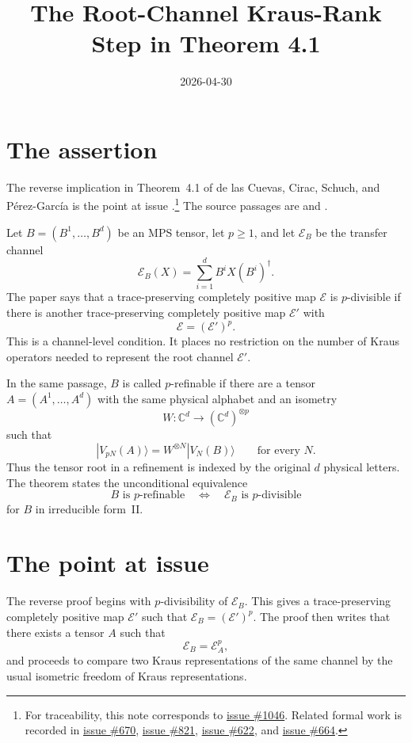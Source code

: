\documentclass{article}
\title{The Root-Channel Kraus-Rank Step in Theorem 4.1}
\author{}
\date{2026-04-30}
\begin{document}
\maketitle

\section{The assertion}

The reverse implication in Theorem~4.1 of de las Cuevas, Cirac, Schuch,
and P\'erez-Garc\'ia is the point at issue
\cite[Theorem~4.1]{DeLasCuevas2017Irreducible}.\footnote{For traceability, this
note corresponds to \href{https://github.com/LionSR/TNLean/issues/1046}{issue \#1046}.
Related formal work is recorded in
\href{https://github.com/LionSR/TNLean/issues/670}{issue \#670},
\href{https://github.com/LionSR/TNLean/issues/821}{issue \#821},
\href{https://github.com/LionSR/TNLean/issues/622}{issue \#622}, and
\href{https://github.com/LionSR/TNLean/issues/664}{issue \#664}.} The source passages
are  and
.

Let $B=(B^1,\ldots,B^d)$ be an MPS tensor, let $p\geq 1$, and let
$\mathcal E_B$ be the transfer channel
\[
  \mathcal E_B(X)=\sum_{i=1}^d B^i X (B^i)^\dagger.
\]
The paper says that a trace-preserving completely positive map $\mathcal E$ is
$p$-divisible if there is another trace-preserving completely positive map
$\mathcal E'$ with
\[
  \mathcal E=(\mathcal E')^p.
\]
This is a channel-level condition. It places no restriction on the number of
Kraus operators needed to represent the root channel $\mathcal E'$.

In the same passage, $B$ is called $p$-refinable if there are a tensor
$A=(A^1,\ldots,A^d)$ with the same physical alphabet and an isometry
\[
  W:\mathbb C^d \longrightarrow (\mathbb C^d)^{\otimes p}
\]
such that
\[
  |V_{pN}(A)\rangle = W^{\otimes N}|V_N(B)\rangle
  \qquad\text{for every } N.
\]
Thus the tensor root in a refinement is indexed by the original $d$ physical
letters. The theorem states the unconditional equivalence
\[
  B \text{ is } p\text{-refinable}
  \quad\Longleftrightarrow\quad
  \mathcal E_B \text{ is } p\text{-divisible}
\]
for $B$ in irreducible form~II.

\section{The point at issue}

The reverse proof begins with $p$-divisibility of $\mathcal E_B$. This gives a
trace-preserving completely positive map $\mathcal E'$ such that
$\mathcal E_B=(\mathcal E')^p$. The proof then writes that there exists a tensor
$A$ such that
\[
  \mathcal E_B=\mathcal E_A^p,
\]
and proceeds to compare two Kraus representations of the same channel by the
usual isometric freedom of Kraus representations.
\end{document}
